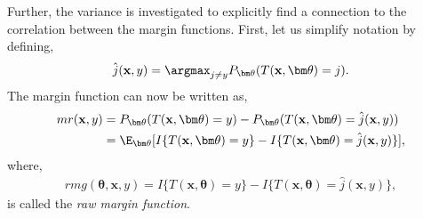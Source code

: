 Further, the variance is investigated to explicitly find a connection to the correlation between the margin functions.  
First, let us simplify notation by defining,
\begin{align}
  \hat j(\mathbf{x}, y) = \argmax_{j \neq y} P_{\bm \theta}(T(\mathbf{x}, \bm \theta) = j).
\end{align}
The margin function can now be written as,
\begin{align}
  mr(\mathbf{x},y) 
  &= P_{\bm \theta}(T(\mathbf{x},\bm \theta) = y) - P_{\bm \theta} (T(\mathbf{x}, \bm \theta) = \hat j (\mathbf{x}, y)) \notag \\
  &= \E_{\bm \theta}[I\{T(\mathbf{x},\bm \theta) = y\} - I\{T(\mathbf{x}, \bm \theta) = \hat j (\mathbf{x}, y)\}],
\end{align}
where,
\begin{align}
  rmg(\bm \theta, \mathbf{x}, y) = I\{T(\mathbf{x},\bm \theta) = y\} - I\{T(\mathbf{x}, \bm \theta) = \hat j (\mathbf{x}, y)\},
\end{align}
is called the \textit{raw margin function}.

